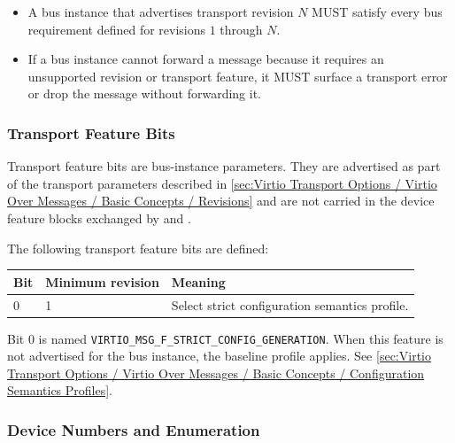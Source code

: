 \begin{itemize}
  \item A bus instance that advertises transport revision $N$ MUST satisfy every
        bus requirement defined for revisions $1$ through $N$.
  \item If a bus instance cannot forward a message because it requires an
        unsupported revision or transport feature, it MUST surface a transport
        error or drop the message without forwarding it.
\end{itemize}

\subsubsection{Transport Feature Bits}
\label{sec:Virtio Transport Options / Virtio Over Messages / Basic Concepts / Transport Feature Bits}

Transport feature bits are bus-instance parameters. They are advertised as part
of the transport parameters described in
\ref{sec:Virtio Transport Options / Virtio Over Messages / Basic Concepts / Revisions}
and are not carried in the device feature blocks exchanged by
 and .

The following transport feature bits are defined:

\begin{tabular}{|l|l|p{7cm}|}
\hline
Bit & Minimum revision & Meaning \\
\hline
0 & 1 & Select strict configuration semantics profile. \\
\hline
\end{tabular}

Bit 0 is named \texttt{VIRTIO\_MSG\_F\_STRICT\_CONFIG\_GENERATION}.
When this feature is not advertised for the bus instance, the baseline profile
applies. See
\ref{sec:Virtio Transport Options / Virtio Over Messages / Basic Concepts / Configuration Semantics Profiles}.

\subsubsection{Device Numbers and Enumeration}
\label{sec:Virtio Transport Options / Virtio Over Messages / Basic Concepts /
Device Numbers}

